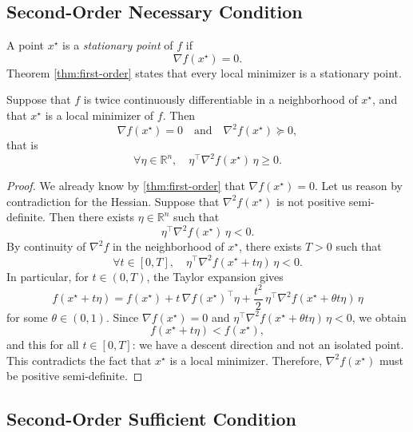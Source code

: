 \subsection{Second-Order Necessary Condition}
\label{subsec:2.2.3}

\begin{definition}
A point $x^\star$ is a \emph{stationary point} of $f$ if
\[
    \nabla f(x^\star) = 0.
\]
Theorem \ref{thm:first-order} states that every local minimizer is a stationary point.
\end{definition}

\begin{theoreme}
\label{thm:second-order-necessary}
Suppose that $f$ is twice continuously differentiable in a neighborhood of $x^\star$,
and that $x^\star$ is a local minimizer of $f$. Then
\[
    \nabla f(x^\star) = 0
    \quad\text{and}\quad
    \nabla^2 f(x^\star) \succeq 0,
\]
that is
\[
    \forall \eta \in \mathbb{R}^n,\quad
    \eta^\top \nabla^2 f(x^\star)\,\eta \ge 0.
\]
\end{theoreme}

\begin{proof}
We already know by \autoref{thm:first-order} that $\nabla f(x^\star)=0$.
Let us reason by contradiction for the Hessian. Suppose that $\nabla^2 f(x^\star)$
is not positive semi-definite. Then there exists $\eta \in \mathbb{R}^n$
such that
\[
    \eta^\top \nabla^2 f(x^\star)\,\eta < 0.
\]
By continuity of $\nabla^2 f$ in the neighborhood of $x^\star$, there exists $T>0$ such that
\[
    \forall t \in [0,T],\quad
    \eta^\top \nabla^2 f(x^\star + t\eta)\,\eta < 0.
\]
In particular, for $t\in(0,T)$, the Taylor expansion gives
\[
    f(x^\star + t\eta)
    = f(x^\star) + t\,\nabla f(x^\star)^\top \eta
      + \frac{t^2}{2}\,\eta^\top \nabla^2 f(x^\star + \theta t\eta)\,\eta
\]
for some $\theta \in (0,1)$. Since $\nabla f(x^\star)=0$ and
$\eta^\top \nabla^2 f(x^\star + \theta t\eta)\,\eta < 0$, we obtain
\[
    f(x^\star + t\eta) < f(x^\star),
\]
and this for all $t \in [0,T]$: we have a descent direction and not an isolated point. This contradicts the fact that $x^\star$ is a local minimizer.
Therefore, $\nabla^2 f(x^\star)$ must be positive semi-definite.
\end{proof}

\subsection{Second-Order Sufficient Condition}
\label{subsec:2.2.4}

